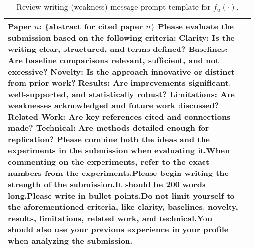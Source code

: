 \begin{table*}[ht]
\begin{tabular}{p{1cm}p{11.5cm}}
Paper $n$: \{abstract for cited paper $n$\} \newline Please evaluate the submission based on the following criteria: \newline Clarity: Is the writing clear, structured, and terms defined? \newline Baselines: Are baseline comparisons relevant, sufficient, and not excessive? \newline Novelty: Is the approach innovative or distinct from prior work? \newline Results: Are improvements significant, well-supported, and statistically robust? \newline Limitations: Are weaknesses acknowledged and future work discussed? \newline Related Work: Are key references cited and connections made? \newline Technical: Are methods detailed enough for replication? \newline Please combine both the ideas and the experiments in the submission when evaluating it.\newline When commenting on the experiments, refer to the exact numbers from the experiments.\newline Please begin writing the strength of the submission.\newline It should be 200 words long.\newline Please write in bullet points.\newline Do not limit yourself to the aforementioned criteria, like clarity, baselines, novelty, results, limitations, related work, and technical.\newline You should also use your previous experience in your profile when analyzing the submission. \\
\bottomrule[1.5pt]
\end{tabular}
\caption{Review writing (weakness) message prompt template for $f_u(\cdot)$.}
\label{tab:Agent_Review_Weakness_Writing_Prompt}
\end{table*}

